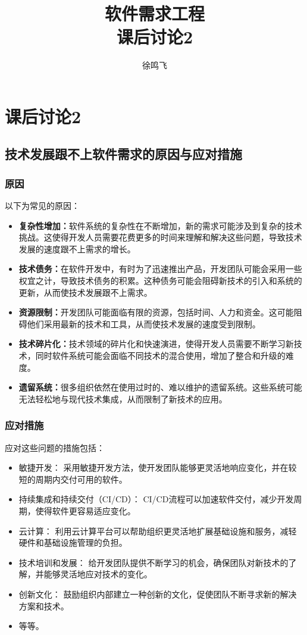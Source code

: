 \documentclass[11pt, a4paper, oneside]{ctexbook}
\title{{\Huge{\textbf{软件需求工程}}}\\课后讨论2}
\author{徐鸣飞}
\date{}
\begin{document}
\maketitle
{}
\setcounter{page}{1}
\newpage
{}
\setcounter{page}{1}
\tableofcontents
\newpage
\setcounter{page}{1}

\chapter{课后讨论2}
\section{技术发展跟不上软件需求的原因与应对措施}
\subsection{原因}
以下为常见的原因：
\begin{itemize}
    \item \textbf{复杂性增加：}软件系统的复杂性在不断增加，新的需求可能涉及到复杂的技术挑战。这使得开发人员需要花费更多的时间来理解和解决这些问题，导致技术发展的速度跟不上需求的增长。
    \item \textbf{技术债务：}在软件开发中，有时为了迅速推出产品，开发团队可能会采用一些权宜之计，导致技术债务的积累。这种债务可能会阻碍新技术的引入和系统的更新，从而使技术发展跟不上需求。
    \item \textbf{资源限制：}开发团队可能面临有限的资源，包括时间、人力和资金。这可能阻碍他们采用最新的技术和工具，从而使技术发展的速度受到限制。
    \item \textbf{技术碎片化：}技术领域的碎片化和快速演进，使得开发人员需要不断学习新技术，同时软件系统可能会面临不同技术的混合使用，增加了整合和升级的难度。
    \item \textbf{遗留系统：}很多组织依然在使用过时的、难以维护的遗留系统。这些系统可能无法轻松地与现代技术集成，从而限制了新技术的应用。
\end{itemize}
\subsection{应对措施}
应对这些问题的措施包括：
\begin{itemize}
    \item 敏捷开发： 采用敏捷开发方法，使开发团队能够更灵活地响应变化，并在较短的周期内交付可用的软件。
    \item 持续集成和持续交付（CI/CD）： CI/CD流程可以加速软件交付，减少开发周期，使得软件更容易适应变化。
    \item 云计算： 利用云计算平台可以帮助组织更灵活地扩展基础设施和服务，减轻硬件和基础设施管理的负担。
    \item 技术培训和发展： 给开发团队提供不断学习的机会，确保团队对新技术的了解，并能够灵活地应对技术的变化。
    \item 创新文化： 鼓励组织内部建立一种创新的文化，促使团队不断寻求新的解决方案和技术。
    \item 等等。
\end{itemize}
\end{document}
